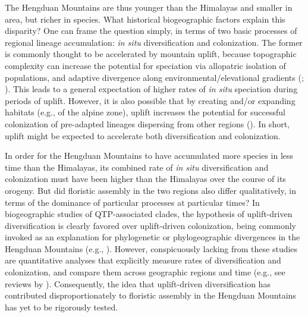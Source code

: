 The Hengduan Mountains are thus younger than the Himalayas and smaller in area, but richer in species. What historical biogeographic factors explain this disparity? One can frame the question simply, in terms of two basic processes of regional lineage accumulation: \textit{in situ} diversification and colonization. The former is commonly thought to be accelerated by mountain uplift, because topographic complexity can increase the potential for speciation via allopatric isolation of populations, and adaptive divergence along environmental/elevational gradients (\cite{Hughes2006};\cite{LiuJ2006} \cite{Xu2010}). This leads to a general expectation of higher rates of \textit{in situ} speciation during periods of uplift. However, it is also possible that by creating and/or expanding habitats (e.g., of the alpine zone), uplift increases the potential for successful colonization of pre-adapted lineages dispersing from other regions (\cite{Zhou2013}). In short, uplift might be expected to accelerate both diversification and colonization.

In order for the Hengduan Mountains to have accumulated more species in less time than the Himalayas, its combined rate of \textit{in situ} diversification and colonization must have been higher than the Himalayas over the course of its orogeny. But did floristic assembly in the two regions also differ qualitatively, in terms of the dominance of particular processes at particular times? In biogeographic studies of QTP-associated clades, the hypothesis of uplift-driven diversification is clearly favored over uplift-driven colonization, being commonly invoked as an explanation for phylogenetic or phylogeographic divergences in the Hengduan Mountains (e.g., \cite{LiuJ2006}\cite{WangY2009}\cite{ZhangJ2014}). However, conspicuously lacking from these studies are quantitative analyses that explicitly measure rates of diversification and colonization, and compare them across geographic regions and time (e.g., see reviews by \cite{Wen2014}\cite{Favre2014}). Consequently, the idea that uplift-driven diversification has contributed disproportionately to floristic assembly in the Hengduan Mountains has yet to be rigorously tested.



